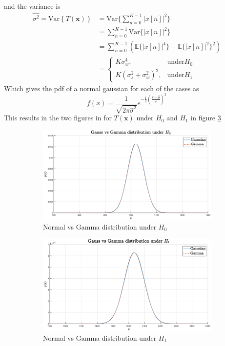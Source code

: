 and the variance is
\begin{align}
    \hat{\sigma^2} = \mathrm{Var}\left\{T(\mathbf{x})\right\} & = \mathrm{Var}\{\sum_{n=0}^{K-1}|x[n]|^2\}\nonumber\\
    & = \sum_{n=0}^{K-1}\mathrm{Var}\{|x[n]|^2\}\nonumber\\
    & = \sum_{n=0}^{K-1}(\mathbb{E}\{|x[n]|^4\}-\mathbb{E}\{|x[n]|^2\}^2\nonumber)\\
    & = \begin{cases}
    K\sigma_w^4, & \text{under} H_0\\
    K(\sigma_s^2+\sigma_w^2)^2, & \text{under} H_1
    \end{cases}
\end{align}
Which gives the pdf of a normal gaussian for each of the cases as
\begin{equation}
    f(x) = \frac{1}{\sqrt{2\pi\hat{\sigma}^2}}e^{-\frac{1}{2}\left(\frac{x-\hat{\mu}}{\hat{\sigma}}\right)^2}
\end{equation}
This results in the two figures in for $T(\mathbf{x})$ under $H_0$ and $H_1$ in figure \ref{fig:clt}
\begin{figure}[ht]
    \begin{subfigure}{\textwidth}
        \centering
        \includegraphics[width=.8\linewidth]{figures/gauss_vs_gamma_h0.eps}  
        \caption{Normal vs Gamma distribution under $H_0$}
        \label{fig:gaussvsgamma_h0}
    \end{subfigure}
    \begin{subfigure}{\textwidth}
        \centering
        \includegraphics[width=.8\linewidth]{figures/gauss_vs_gamma_h1.eps}  
        \caption{Normal vs Gamma distribution under $H_1$}
        \label{fig:gaussvsgamma_h1}
    \end{subfigure}
    \caption{}
    \label{fig:clt}
\end{figure}
